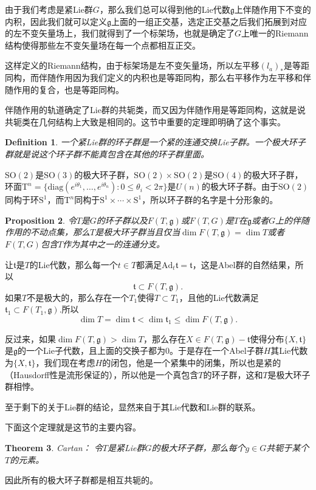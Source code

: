\documentclass[8pt]{book}
\theoremstyle{plain}
\newtheorem{defi}{Definition}
\newtheorem{pro}[defi]{Proposition}
\newtheorem{theo}[defi]{Theorem}
\newcommand{\lag}{{\mathfrak{g}}}  %
\begin{document}
由于我们考虑是紧Lie群$G$，那么我们总可以得到他的Lie代数$\lag$上伴随作用下不变的内积，因此我们就可以定义$\lag$上面的一组正交基，选定正交基之后我们拓展到对应的左不变矢量场上，我们就得到了一个标架场，也就是确定了$G$上唯一的Riemann结构使得那些左不变矢量场在每一个点都相互正交。

这样定义的Riemann结构，由于标架场是左不变矢量场，所以左平移$(l_a)_*$是等距同构，而伴随作用因为我们定义的内积也是等距同构，那么右平移作为左平移和伴随作用的复合，也是等距同构。

伴随作用的轨道确定了Lie群的共轭类，而又因为伴随作用是等距同构，这就是说共轭类在几何结构上大致是相同的。这节中重要的定理即明确了这个事实。
\begin{defi}
一个紧Lie群的环子群是一个紧的连通交换Lie子群。一个极大环子群就是说这个环子群不能真包含在其他的环子群里面。
\end{defi}

$\mathrm{SO}(2)$是$\mathrm{SO}(3)$的极大环子群，$\mathrm{SO}(2)\times \mathrm{SO}(2)$是$\mathrm{SO}(4)$的极大环子群，环面$\mathrm{T}^n=\{\mathrm{diag}(e^{i\theta_1},\dots,e^{i\theta_n}):0\leq\theta_i<2\pi\}$是$U(n)$的极大环子群。由于$\mathrm{SO}(2)$同构于环$\mathrm{S}^1$，而$\mathrm{T}^n$同构于$\mathrm{S}^1\times\cdots\times\mathrm{S}^1$，所以环子群的名字是十分形象的。

\begin{pro}
令$T$是$G$的环子群以及$F(T,\lag)$或$F(T,G)$是$T$在$\lag$或者$G$上的伴随作用的不动点集，那么$T$是极大环子群当且仅当$\dim F(T,\lag)=\dim T$或者$F(T,G)$包含$T$作为其中之一的连通分支。
\end{pro}
让$\mathfrak{t}$是$T$的Lie代数，那么每一个$t\in T$都满足$\mathrm{Ad}_t\mathfrak{t}=\mathfrak{t}$，这是Abel群的自然结果，所以
\[
	\mathfrak{t}\subset F(T,\lag).
\]
如果$T$不是极大的，那么存在一个$T_1$使得$T\subset T_1$，且他的Lie代数满足$\mathfrak{t}_1\subset F(T_1,\lag)$.所以
\[
	\dim T=\dim \mathfrak{t}<\dim \mathfrak{t}_1\leq \dim F(T,\lag).
\]

反过来，如果$\dim  F(T,\lag)>\dim T$，那么存在$X\in F(T,\lag)-\mathfrak{t}$使得分布$\{X,\mathfrak{t}\}$是$\lag$的一个Lie子代数，且上面的交换子都为$0$。于是存在一个Abel子群$H$其Lie代数为$\{X,\mathfrak{t}\}$，我们现在考虑$H$的闭包，他是一个紧集中的闭集，所以也是紧的（Hausdorff性是流形保证的），所以他是一个真包含$T$的环子群，这和$T$是极大环子群相悖。

至于剩下的关于Lie群的结论，显然来自于其Lie代数和Lie群的联系。

下面这个定理就是这节的主要内容。
\begin{theo}Cartan：
令$T$是紧Lie群$G$的极大环子群，那么每个$g\in G$共轭于某个$T$的元素。
\end{theo}
因此所有的极大环子群都是相互共轭的。
\end{document}
